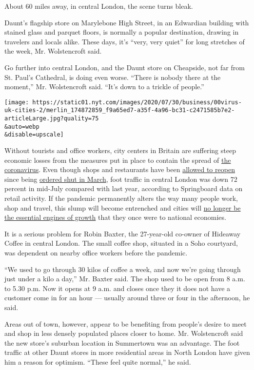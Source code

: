 About 60 miles away, in central London, the scene turns bleak.

Daunt's flagship store on Marylebone High Street, in an Edwardian
building with stained glass and parquet floors, is normally a popular
destination, drawing in travelers and locals alike. These days, it's
``very, very quiet'' for long stretches of the week, Mr. Wolstencroft
said.

Go further into central London, and the Daunt store on Cheapside, not
far from St. Paul's Cathedral, is doing even worse. ``There is nobody
there at the moment,'' Mr. Wolstencroft said. ``It's down to a trickle
of people.''

\texttt{[image: https://static01.nyt.com/images/2020/07/30/business/00virus-uk-cities-2/merlin\_174872859\_f9a65ed7-a35f-4a96-bc31-c2471585b7e2-articleLarge.jpg?quality=75\\\&auto=webp\\\&disable=upscale]}

Without tourists and office workers, city centers in Britain are
suffering steep economic losses from the measures put in place to
contain the spread of
\href{https://www.nytimes.com/news-event/coronavirus}{the coronavirus}.
Even though shops and restaurants have been
\href{https://www.nytimes.com/2020/06/23/world/europe/uk-coronavirus-reopening.html}{allowed
to reopen} since being
\href{https://www.nytimes.com/2020/03/24/world/europe/britain-coronavirus-lockdown.html}{ordered
shut in March}, foot traffic in central London was down 72 percent in
mid-July compared with last year, according to Springboard data on
retail activity. If the pandemic permanently alters the way many people
work, shop and travel, this slump will become entrenched and cities will
\href{https://www.nytimes.com/2020/07/21/business/economy/coronavirus-cities.html}{no
longer be the essential engines of growth} that they once were to
national economies.

It is a serious problem for Robin Baxter, the 27-year-old co-owner of
Hideaway Coffee in central London. The small coffee shop, situated in a
Soho courtyard, was dependent on nearby office workers before the
pandemic.

``We used to go through 30 kilos of coffee a week, and now we're going
through just under a kilo a day,'' Mr. Baxter said. The shop used to be
open from 8 a.m. to 5.30 p.m. Now it opens at 9 a.m. and closes once
they it does not have a customer come in for an hour --- usually around
three or four in the afternoon, he said.

Areas out of town, however, appear to be benefiting from people's desire
to meet and shop in less densely populated places closer to home. Mr.
Wolstencroft said the new store's suburban location in Summertown was an
advantage. The foot traffic at other Daunt stores in more residential
areas in North London have given him a reason for optimism. ``These feel
quite normal,'' he said.

